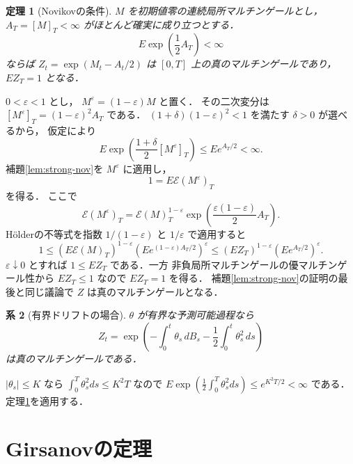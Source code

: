 \documentclass[a5paper,10pt,onecolumn]{jsarticle}
\makeatletter
\theoremstyle{mathnotetheorem}
\newtheorem{theorem}{定理}[section]
\newtheorem{corollary}[theorem]{系}
\renewcommand{\proofname}{証明}
\renewenvironment{proof}[1][\proofname]{%
  \par\pushQED{\qed}\normalfont\topsep4\p@\@plus2\p@\relax
  \trivlist\item[\hskip\labelsep\bfseries #1]\ignorespaces
}{\popQED\endtrivlist\@endpefalse}
\makeatother
\begin{document}
\begin{theorem}[Novikovの条件]\label{thm:novikov}
$M$ を初期値零の連続局所マルチンゲールとし，
$A_T=[M]_T<\infty$ がほとんど確実に成り立つとする．
\[
 E\exp\!\left(\frac12A_T\right)<\infty
\]
ならば
$Z_t=\exp(M_t-A_t/2)$ は
$[0,T]$ 上の真のマルチンゲールであり，
$EZ_T=1$ となる．
\end{theorem}
\begin{proof}
$0<\varepsilon<1$ とし，
$M^\varepsilon=(1-\varepsilon)M$ と置く．
その二次変分は
$[M^\varepsilon]_T=(1-\varepsilon)^2A_T$ である．
$(1+\delta)(1-\varepsilon)^2<1$ を満たす
$\delta>0$ が選べるから，
仮定により
\[
 E\exp\!\left(
 \frac{1+\delta}{2}[M^\varepsilon]_T\right)
 \le E e^{A_T/2}<\infty.
\]
補題\ref{lem:strong-nov}を $M^\varepsilon$ に適用し，
\[
 1=E\mathcal E(M^\varepsilon)_T
 \tag{$*$}
\]
を得る．
ここで
\[
 \mathcal E(M^\varepsilon)_T
 =\mathcal E(M)_T^{1-\varepsilon}
  \exp\!\left(\frac{\varepsilon(1-\varepsilon)}2 A_T\right).
\]
H\"olderの不等式を指数
$1/(1-\varepsilon)$ と $1/\varepsilon$ で適用すると
\[
 1\le
 (E\mathcal E(M)_T)^{1-\varepsilon}
 \left(Ee^{(1-\varepsilon)A_T/2}\right)^\varepsilon
 \le
 (EZ_T)^{1-\varepsilon}
 (Ee^{A_T/2})^\varepsilon.
\]
$\varepsilon\downarrow0$ とすれば
$1\le EZ_T$ である．一方
非負局所マルチンゲールの優マルチンゲール性から
$EZ_T\le1$ なので $EZ_T=1$ を得る．
補題\ref{lem:strong-nov}の証明の最後と同じ議論で
$Z$ は真のマルチンゲールとなる．
\end{proof}

\begin{corollary}[有界ドリフトの場合]\label{cor:bounded-theta}
$\theta$ が有界な予測可能過程なら
\[
 Z_t=\exp\!\left(
 -\int_0^t\theta_s\,dB_s
 -\frac12\int_0^t\theta_s^2\,ds\right)
\]
は真のマルチンゲールである．
\end{corollary}
\begin{proof}
$|\theta_s|\le K$ なら
$\int_0^T\theta_s^2ds\le K^2T$ なので
$E\exp(\frac12\int_0^T\theta_s^2ds)
 \le e^{K^2T/2}<\infty$ である．
定理\ref{thm:novikov}を適用する．
\end{proof}

\section{Girsanovの定理}
\end{document}
